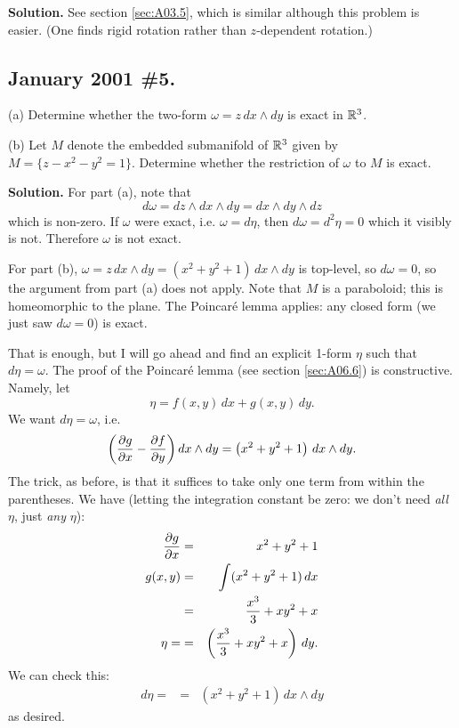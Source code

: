 \documentclass[10pt]{article}
\numberwithin{equation}{subsection}
\begin{document}
\textbf{Solution.}  See section \ref{sec:A03.5}, which is similar although this
problem is easier.  (One finds rigid rotation rather than $z$-dependent
rotation.)

\subsection{January 2001 \#5.}

(a) Determine whether the two-form $\omega = z\, dx \wedge dy$ is
exact in $\mathbb{R}^3$.

(b) Let $M$ denote the embedded submanifold of $\mathbb{R}^3$ given by
$M=\{z-x^2-y^2=1\}$.  Determine whether the restriction of $\omega$ to $M$ is
exact.

\textbf{Solution.}  For part (a), note that 
$$
	d\omega = dz \wedge dx \wedge dy = dx \wedge dy \wedge dz
$$
which is non-zero.  If $\omega$ were exact, i.e. $\omega=d\eta$, then $d\omega
= d^2\eta = 0$ which it visibly is not.  Therefore $\omega$ is not exact.

For part (b), $\omega=z\,dx\wedge dy = (x^2+y^2+1)\, dx \wedge dy$ is
top-level, so $d\omega = 0$, so the argument from part (a) does not apply.
Note that $M$ is a paraboloid; this is homeomorphic to the plane.  The
Poincar\'e lemma applies:  any closed form (we just saw $d\omega=0$) is exact.

That is enough, but I will go ahead and find an explicit 1-form $\eta$ such
that $d\eta=\omega$.  The proof of the Poincar\'e lemma (see section
\ref{sec:A06.6}) is constructive.  Namely, let
$$
	\eta = f(x,y)\,dx + g(x,y)\,dy.
$$
We want $d\eta=\omega$, i.e.
$$
	\left(\frac{\partial g}{\partial x} - \frac{\partial f}{\partial y}\right) dx \wedge dy
		= \left(x^2 + y^2 + 1\right) \,dx\wedge dy.
$$
The trick, as before, is that it suffices to take only one term from within the
parentheses.  We have (letting the integration constant be zero:  we don't need
\emph{all} $\eta$, just \emph{any} $\eta$):
\begin{eqnarray*}
	\frac{\partial g}{\partial x} &=& x^2 + y^2 + 1 \\
	g(x,y) &=& \int (x^2 + y^2 + 1) \,dx \\
	&=& \frac{x^3}{3} + xy^2 + x \\
	\eta = &=& \left(\frac{x^3}{3} + xy^2 + x\right) \,dy.
\end{eqnarray*}
We can check this:
\begin{eqnarray*}
	d\eta = &=& (x^2  + y^2 + 1) \,dx \wedge dy
\end{eqnarray*}
as desired.
\end{document}
